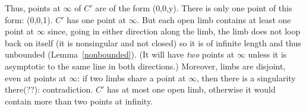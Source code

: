 Thus, points at $\infty$ of $C'$ are of the form (0,0,y).
There is only one point of this form: \mbox{(0,0,1)}.
\hence $C'$ has one point at $\infty$.  
But each open limb contains at least one point at $\infty$ since, going in
either direction along the limb, the limb does not loop back on itself 
(it is nonsingular and not closed) so it is of infinite length and 
thus unbounded (Lemma~\ref{nonbounded}).
(It will have {\em two} points at $\infty$ unless it is asymptotic to the 
same line in both directions.)
Moreover, limbs are disjoint, even at points at $\infty$: if two limbs
share a point at $\infty$, then there is a singularity 
there(??): contradiction.
\hence $C'$ has at most one open limb, otherwise it would contain more than
two points at infinity.

